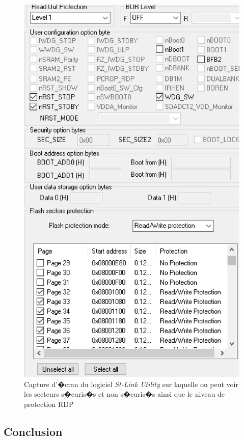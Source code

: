 \documentclass[a4paper, titlepage,12pt]{report}
\begin{document}
\begin{figure}[!h]
\centering
\includegraphics[scale=0.4]{img/eps/TestDintegrationPCrOPRDP.eps}
\caption{Capture d'�cran du logiciel \textit{St-Link Utility} sur laquelle on peut voir les secteurs s�curis�s et non s�curis�s ainsi que le niveau de protection RDP}
\label{TestDint�grationPCrOPRDP}
\end{figure}
\pagebreak


\subsection{Conclusion}
\end{document}
